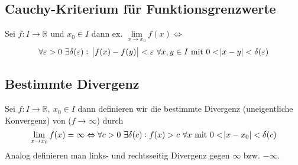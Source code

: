 \documentclass[10pt]{article}
\newcommand{\R}{\mathbb{R}}
\begin{document}
    \subsection{Cauchy-Kriterium für Funktionsgrenzwerte}
    Sei $f: I \rightarrow \R$ und $x_0 \in I$ dann ex.
    $\lim\limits_{x \rightarrow x_0} f(x) \Leftrightarrow$
    \begin{equation*}
        \forall \varepsilon > 0\ \exists \delta(\varepsilon):\
        \abs{f(x) - f(y)}<\varepsilon\ \forall x,y \in I \text{ mit }
        0 < \abs{x-y} < \delta(\varepsilon)
    \end{equation*}

    \subsection{Bestimmte Divergenz}
    Sei $f: I \rightarrow \R ,\ x_0 \in I$ dann definieren wir die bestimmte
    Divergenz (uneigentliche Konvergenz) von ($f \rightarrow \infty$) durch
    \begin{equation*}
        \lim_{x \rightarrow x_0} f(x) = \infty \Leftrightarrow
        \forall c>0\ \exists \delta(c): f(x) > c\ \forall x \text{ mit }
        0 < \abs{x - x_0} < \delta(c)
    \end{equation*}
    Analog definieren man links- und rechtsseitig Divergenz gegen $\infty$ bzw.
    $-\infty$.
\end{document}
